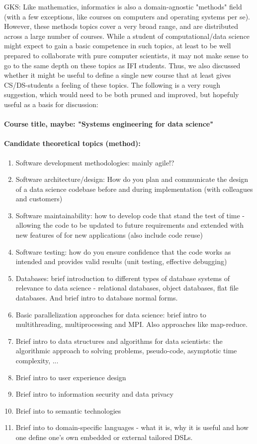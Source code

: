 \documentclass[oneside,final,10pt]{article}
\begin{document}
GKS: Like mathematics, informatics is also a domain-agnostic "methods" field (with a few exceptions, like courses on computers and operating systems per se). However, these methods topics cover a very broad range, and are distributed across a large number of courses. While a student of computational/data science might expect to gain a basic competence in such topics, at least to be well prepared to collaborate with pure computer scientists, it may not make sense to go to the same depth on these topics as IFI students. Thus, we also discussed whether it might be useful to define a single new course that at least gives CS/DS-students a feeling of these topics. The following is a very rough suggestion, which would need to be both pruned and improved, but hopefuly useful as a basis for discussion:
\paragraph{Course title, maybe: "Systems engineering for data science"}
\paragraph{Candidate theoretical topics (method):}
\begin{enumerate}
\item Software development methodologies: mainly agile!?
\item Software architecture/design: How do you plan and communicate the design of a data science codebase before and during implementation (with colleagues and customers)
\item Software maintainability: how to develop code that stand the test of time - allowing the code to be updated to future requirements and extended with new features of for new applications (also include code reuse)
\item Software testing: how do you ensure confidence that the code works as intended and provides valid results (unit testing, effective debugging)
\item Databases: brief introduction to different types of database systems of relevance to data science - relational databases, object databases, flat file databases. And brief intro to database normal forms.
\item Basic parallelization approaches for data science: brief intro to multithreading, multiprocessing and MPI. Also approaches like map-reduce.
\item Brief intro to data structures and algorithms for data scientists: the algorithmic approach to solving problems, pseudo-code, asymptotic time complexity, ...
\item Brief intro to user experience design
\item Brief intro to information security and data privacy
\item Brief into to semantic technologies
\item Brief into to domain-specific languages - what it is, why it is useful and how one define one's own embedded or external tailored DSLs.
\end{enumerate}
\end{document}
